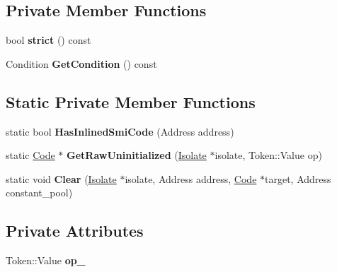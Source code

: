 \subsection*{Private Member Functions}
\begin{DoxyCompactItemize}
\item 
bool {\bfseries strict} () const \hypertarget{classv8_1_1internal_1_1_compare_i_c_a1743dffc4bf02db26ce588ac05c006f7}{}\label{classv8_1_1internal_1_1_compare_i_c_a1743dffc4bf02db26ce588ac05c006f7}

\item 
Condition {\bfseries Get\+Condition} () const \hypertarget{classv8_1_1internal_1_1_compare_i_c_ad7df0780fed5035bb6a5d5085ea13719}{}\label{classv8_1_1internal_1_1_compare_i_c_ad7df0780fed5035bb6a5d5085ea13719}

\end{DoxyCompactItemize}
\subsection*{Static Private Member Functions}
\begin{DoxyCompactItemize}
\item 
static bool {\bfseries Has\+Inlined\+Smi\+Code} (Address address)\hypertarget{classv8_1_1internal_1_1_compare_i_c_a391628ba39a30145fe3002017fa4a141}{}\label{classv8_1_1internal_1_1_compare_i_c_a391628ba39a30145fe3002017fa4a141}

\item 
static \hyperlink{classv8_1_1internal_1_1_code}{Code} $\ast$ {\bfseries Get\+Raw\+Uninitialized} (\hyperlink{classv8_1_1internal_1_1_isolate}{Isolate} $\ast$isolate, Token\+::\+Value op)\hypertarget{classv8_1_1internal_1_1_compare_i_c_acd80e92149c7d51a3e5178d27494f704}{}\label{classv8_1_1internal_1_1_compare_i_c_acd80e92149c7d51a3e5178d27494f704}

\item 
static void {\bfseries Clear} (\hyperlink{classv8_1_1internal_1_1_isolate}{Isolate} $\ast$isolate, Address address, \hyperlink{classv8_1_1internal_1_1_code}{Code} $\ast$target, Address constant\+\_\+pool)\hypertarget{classv8_1_1internal_1_1_compare_i_c_a2e5464acd244635aed861db503a7749f}{}\label{classv8_1_1internal_1_1_compare_i_c_a2e5464acd244635aed861db503a7749f}

\end{DoxyCompactItemize}
\subsection*{Private Attributes}
\begin{DoxyCompactItemize}
\item 
Token\+::\+Value {\bfseries op\+\_\+}\hypertarget{classv8_1_1internal_1_1_compare_i_c_a9c5c436bbee3b1b413c1e118549cd855}{}\label{classv8_1_1internal_1_1_compare_i_c_a9c5c436bbee3b1b413c1e118549cd855}

\end{DoxyCompactItemize}
